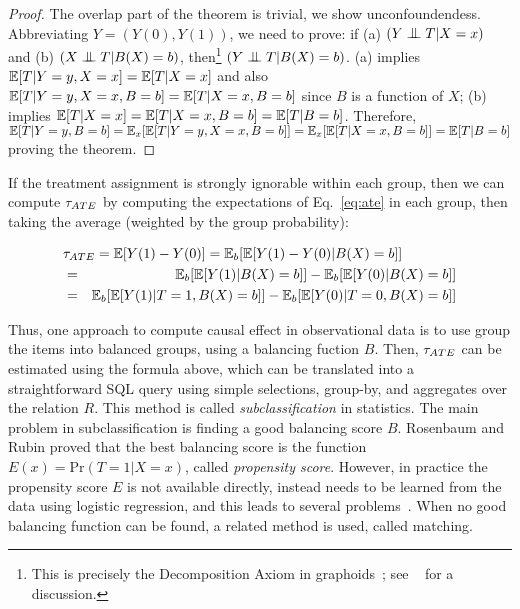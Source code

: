 \vspace{-0.3cm}
\begin{proof}
  The overlap part of the theorem is trivial, we show
  unconfoundendess.  Abbreviating $Y = (Y(0),Y(1))$, we need to prove:
  if (a) $({Y \bigCI T} | X=x)$ and (b) $({X \bigCI T} | B(X)=b)$,
  then\footnote{This is precisely the Decomposition Axiom in
    graphoids~\cite[the. 1]{PearlBook1998}; see ~\cite{DBLP:journals/ipl/GyssensNG14} for a
    discussion.}  $({Y \bigCI T} | B(X)=b)$.  (a) implies
  $\mathbb{E}[T | Y=y, X=x] = \mathbb{E}[T | X=x]$ and also
  $\mathbb{E}[T | Y=y, X=x, B=b] = \mathbb{E}[T | X=x, B=b]$ since $B$ is a function
  of $X$; (b) implies $\mathbb{E}[T | X=x] = \mathbb{E}[T | X=x, B=b] = \mathbb{E}[T | B=b]$.
  Therefore,
  $\mathbb{E}[T | Y=y, B=b] = \mathbb{E}_x[\mathbb{E}[T | Y=y,X=x,B=b]] = \mathbb{E}_x[\mathbb{E}[T | X=x,
  B=b]] = \mathbb{E}[T | B=b]$ proving the theorem.
\end{proof}


If the treatment assignment is strongly ignorable within each group,
then we can compute ${\tau_{ATE}}$ by computing the expectations of
Eq.~\ref{eq:ate} in each group, then taking the average (weighted by
the group probability):

\begin{eqnarray}
\lefteqn{\ate = \E[Y(1)-Y(0)] = \E_b[\E[Y(1)-Y(0)| B(X)=b]]} \label{eq:oatt} \\
  &=& \E_b[\E[Y(1)|B(X)=b]]-\E_b[\E[Y(0)|B(X)=b]] \nonumber \\
  &=& \E_b[\E[Y(1)|T=1,B(X)=b]]-\E_b[\E[Y(0)|T=0,B(X)=b]] \nonumber
\end{eqnarray}



Thus, one approach to compute causal effect in observational data is
to use group the items into balanced groups, using a balancing fuction
$B$.  Then, ${\tau_{ATE}}$ can be estimated using the formula above, which can
be translated into a straightforward SQL query using simple
selections, group-by, and aggregates over the relation $R$.  This
method is called {\em subclassification} in statistics.  The main
problem in subclassification is finding a good balancing score $B$.
Rosenbaum and Rubin proved that the best balancing score is the
function $E(x) = \textrm{Pr}(T = 1 | X=x)$, called {\em propensity
  score}.  However, in practice the propensity score $E$ is not
available directly, instead needs to be learned from the data using
logistic regression, and this leads to several
problems~\cite{king15}.  When no good balancing function can be found,
a related method is used, called matching.



